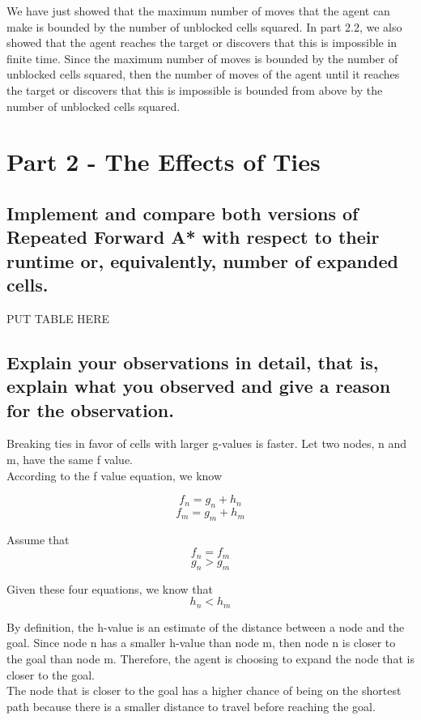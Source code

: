 \documentclass{article}
\begin{document}
We have just showed that the maximum number of moves that the agent can make is bounded by the number of unblocked cells squared. In part 2.2, we also showed that the agent reaches the target or discovers that this is impossible in finite time. Since the maximum number of moves is bounded by the number of unblocked cells squared, then the number of moves of the agent until it reaches the target or discovers that this is impossible is bounded from above by the number of unblocked cells squared.


\section{Part 2 - The Effects of Ties}

\subsection{Implement and compare both versions of Repeated Forward A* with respect to their runtime or, equivalently, number of expanded cells.}
 
PUT TABLE HERE

\subsection{Explain your observations in detail, that is, explain what you observed and give a reason for the observation.}

Breaking ties in favor of cells with larger g-values is faster. Let two nodes, n and m, have the same f value. \\
According to the f value equation, we know

\[f_n = g_n + h_n \]
\[f_m = g_m + h_m \]

Assume that
\[f_n = f_m \]
\[g_n > g_m \]

Given these four equations, we know that
\[h_n<h_m\]

By definition, the h-value is an estimate of the distance between a node and the goal. Since node n has a smaller h-value than node m, then node n is closer to the goal than node m. Therefore, the agent is choosing to expand the node that is closer to the goal. \\
The node that is closer to the goal has a higher chance of being on the shortest path because there is a smaller distance to travel before reaching the goal.
\end{document}
